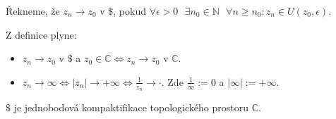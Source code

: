 \begin{definition}
Řekneme, že $z_n\rightarrow z_0$ v $\$$, pokud $\forall\epsilon>0\textbf{ }  \exists n_0\in\mathbb{N}\textbf{ }\forall n\geq n_0:z_n\in U(z_0,\epsilon)$.
\end{definition}

\begin{note} Z definice plyne:
\begin{itemize}
    \item $z_n\rightarrow z_0$ v $\$$ a $z_0\in\mathbb{C}\Leftrightarrow z_n\rightarrow z_0$ v $\mathbb{C}$.
    \item $z_n\rightarrow\infty\Leftrightarrow|z_n|\rightarrow+\infty\Leftrightarrow\frac{1}{z_n}\rightarrow\cdot$. Zde $\frac{1}{\infty}:=0$ a $|\infty|:=+\infty$.
\end{itemize}
\end{note}

\begin{note}
$\$$ je jednobodová kompaktifikace topologického prostoru $\mathbb{C}$.
\end{note}

